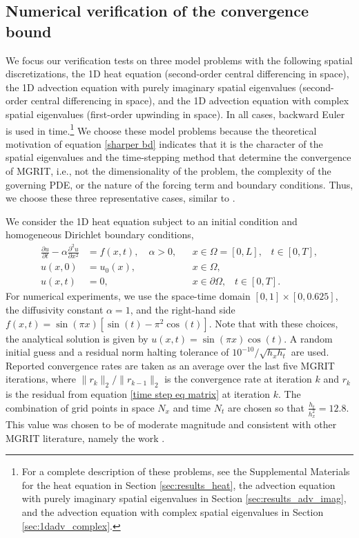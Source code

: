 \documentclass[VANCOUVER,STIX1COL]{WileyNJD-v2}
\begin{document}
\subsection{Numerical verification of the convergence bound} \label{sec: Numerial veri bound}
We focus our verification tests on three model problems with the following spatial discretizations, the 1D heat equation (second-order central differencing in space), the 1D advection equation with purely imaginary
spatial eigenvalues (second-order central differencing in space), and the 1D advection equation with complex spatial eigenvalues (first-order upwinding in space).  In all cases, backward Euler is used in time.\footnote{For a complete description of these problems, see the Supplemental Materials for the heat equation in Section \ref{sec:results_heat},  the advection equation with purely imaginary spatial eigenvalues in Section \ref{sec:results_adv_imag}, and the advection equation with complex spatial eigenvalues in Section \ref{sec:1dadv_complex}.}  We choose these model problems because the theoretical motivation of equation \eqref{sharper bd} indicates that it is the character of the spatial 
eigenvalues and the time-stepping method that determine the convergence of MGRIT, i.e., not the dimensionality of the problem, the complexity of the governing PDE, or the nature of the forcing term and
boundary conditions.  Thus, we choose these three representative cases, similar to \cite{Do2016, HeSoNoRoFaSc2018}.

%
We consider the 1D heat equation subject to an initial condition and homogeneous Dirichlet boundary conditions,
\begin{align}
\frac{\partial u}{\partial t} - \alpha \frac{\partial^2 u}{\partial x^2} &= f(x,t), \quad\alpha > 0, && x \in \Omega = [0, L],\hspace{10pt} t \in [0, T], \nonumber \\
u(x, 0) &= u_0(x), && x \in \Omega, \\
u(x, t) &= 0, && x \in \partial \Omega, \hspace{10pt} t \in [0, T].\nonumber
\end{align} For numerical experiments, we use the space-time domain $[0, 1]\times [0, 0.625]$, the diffusivity constant $\alpha = 1$, and the right-hand side $f(x,t) = \sin(\pi x) [\sin(t) - \pi^2 \cos(t)]$. Note that with these choices, the analytical solution is given by $u(x, t) = \sin(\pi x)\cos(t)$.
A random initial guess and a residual norm halting tolerance of $ 10^{-10} / \sqrt{h_x h_t}$ are used. 
Reported convergence rates are taken as an average over the last five MGRIT
iterations, where $\| r_k\|_2 / \| r_{k-1} \|_2$ is the convergence rate at iteration $k$ and $r_k$ is the residual from equation \eqref{time step eq matrix} at iteration $k$.
The combination of grid points in space $N_x$ and time $N_t$ are chosen so that 
$\frac{h_t}{h_x^2}  = 12.8$.  This value was chosen to be of moderate magnitude and 
consistent with other MGRIT literature, namely the work \cite{Do2016}.
%
\end{document}
